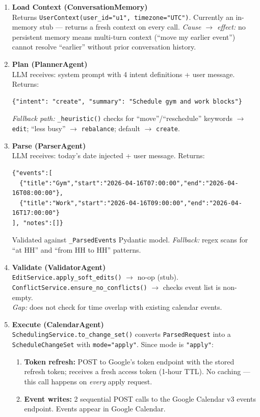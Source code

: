 \documentclass[12pt, a4paper]{article}
\begin{document}
\begin{enumerate}[leftmargin=1.6cm, label=\textbf{Step \arabic*.}]

  \item \textbf{Load Context (ConversationMemory)}\\
    Returns \texttt{UserContext(user\_id="u1", timezone="UTC")}. Currently an in-memory stub --- returns a fresh context on every call. \textit{Cause $\to$ effect:} no persistent memory means multi-turn context (``move my earlier event'') cannot resolve ``earlier'' without prior conversation history.

  \item \textbf{Plan (PlannerAgent)}\\
    LLM receives: system prompt with 4 intent definitions + user message. Returns:
    \begin{lstlisting}[language={}]
{"intent": "create", "summary": "Schedule gym and work blocks"}
    \end{lstlisting}
    \textit{Fallback path:} \texttt{\_heuristic()} checks for ``move''/``reschedule'' keywords $\to$ \texttt{edit}; ``less busy'' $\to$ \texttt{rebalance}; default $\to$ \texttt{create}.

  \item \textbf{Parse (ParserAgent)}\\
    LLM receives: today's date injected + user message. Returns:
    \begin{lstlisting}[language={}]
{"events":[
  {"title":"Gym","start":"2026-04-16T07:00:00","end":"2026-04-16T08:00:00"},
  {"title":"Work","start":"2026-04-16T09:00:00","end":"2026-04-16T17:00:00"}
], "notes":[]}
    \end{lstlisting}
    Validated against \texttt{\_ParsedEvents} Pydantic model. \textit{Fallback:} regex scans for ``at HH'' and ``from HH to HH'' patterns.

  \item \textbf{Validate (ValidatorAgent)}\\
    \texttt{EditService.apply\_soft\_edits()} $\to$ no-op (stub).\\
    \texttt{ConflictService.ensure\_no\_conflicts()} $\to$ checks event list is non-empty.\\
    \textit{Gap:} does not check for time overlap with existing calendar events.

  \item \textbf{Execute (CalendarAgent)}\\
    \texttt{SchedulingService.to\_change\_set()} converts \texttt{ParsedRequest} into a \texttt{ScheduleChangeSet} with \texttt{mode="apply"}. Since mode is \texttt{"apply"}:
    \begin{enumerate}
      \item \textbf{Token refresh:} POST to Google's token endpoint with the stored refresh token; receives a fresh access token (1-hour TTL). No caching --- this call happens on \emph{every} apply request.
      \item \textbf{Event writes:} 2 sequential POST calls to the Google Calendar v3 events endpoint. Events appear in Google Calendar.
    \end{enumerate}


\end{enumerate}
\end{document}
